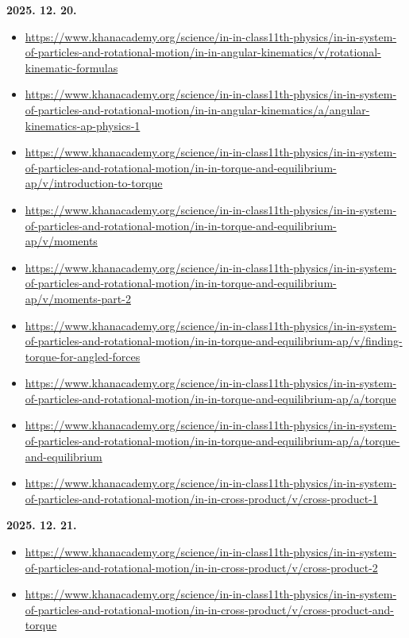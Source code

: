 \documentclass[12pt]{report}
\begin{document}
\noindent\textbf{2025. 12. 20.}
\begin{itemize}[left=0pt, topsep=0pt]
    \item \url{https://www.khanacademy.org/science/in-in-class11th-physics/in-in-system-of-particles-and-rotational-motion/in-in-angular-kinematics/v/rotational-kinematic-formulas}
    \item \url{https://www.khanacademy.org/science/in-in-class11th-physics/in-in-system-of-particles-and-rotational-motion/in-in-angular-kinematics/a/angular-kinematics-ap-physics-1}
    \item \url{https://www.khanacademy.org/science/in-in-class11th-physics/in-in-system-of-particles-and-rotational-motion/in-in-torque-and-equilibrium-ap/v/introduction-to-torque}
    \item \url{https://www.khanacademy.org/science/in-in-class11th-physics/in-in-system-of-particles-and-rotational-motion/in-in-torque-and-equilibrium-ap/v/moments}
    \item \url{https://www.khanacademy.org/science/in-in-class11th-physics/in-in-system-of-particles-and-rotational-motion/in-in-torque-and-equilibrium-ap/v/moments-part-2}
    \item \url{https://www.khanacademy.org/science/in-in-class11th-physics/in-in-system-of-particles-and-rotational-motion/in-in-torque-and-equilibrium-ap/v/finding-torque-for-angled-forces}
    \item \url{https://www.khanacademy.org/science/in-in-class11th-physics/in-in-system-of-particles-and-rotational-motion/in-in-torque-and-equilibrium-ap/a/torque}
    \item \url{https://www.khanacademy.org/science/in-in-class11th-physics/in-in-system-of-particles-and-rotational-motion/in-in-torque-and-equilibrium-ap/a/torque-and-equilibrium}
    \item \url{https://www.khanacademy.org/science/in-in-class11th-physics/in-in-system-of-particles-and-rotational-motion/in-in-cross-product/v/cross-product-1}
\end{itemize}

\noindent\textbf{2025. 12. 21.}
\begin{itemize}[left=0pt, topsep=0pt]
    \item \url{https://www.khanacademy.org/science/in-in-class11th-physics/in-in-system-of-particles-and-rotational-motion/in-in-cross-product/v/cross-product-2}
    \item \url{https://www.khanacademy.org/science/in-in-class11th-physics/in-in-system-of-particles-and-rotational-motion/in-in-cross-product/v/cross-product-and-torque}
\end{itemize}
\end{document}
